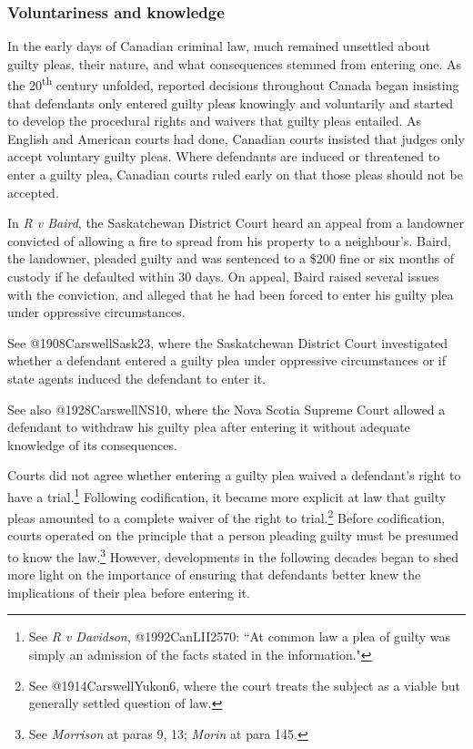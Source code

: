 \subsubsection{Voluntariness and knowledge}

In the early days of Canadian criminal law, much remained unsettled about guilty pleas, their nature, and what consequences stemmed from entering one. As the 20\textsuperscript{th} century unfolded, reported decisions throughout Canada began insisting that defendants only entered guilty pleas knowingly and voluntarily and started to develop the procedural rights and waivers that guilty pleas entailed. As English and American courts had done, Canadian courts insisted that judges only accept voluntary guilty pleas. Where defendants are induced or threatened to enter a guilty plea, Canadian courts ruled early on that those pleas should not be accepted.

In \textit{R v Baird}, the Saskatchewan District Court heard an appeal from a landowner convicted of allowing a fire to spread from his property to a neighbour's. Baird, the landowner, pleaded guilty and was sentenced to a \$200 fine or six months of custody if he defaulted within 30 days. On appeal, Baird raised several issues with the conviction, and alleged that he had been forced to enter his guilty plea under oppressive circumstances. 

See @1908CarswellSask23, where the Saskatchewan District Court investigated whether a defendant entered a guilty plea under oppressive circumstances or if state agents induced the defendant to enter it.

See also @1928CarswellNS10, where the Nova Scotia Supreme Court allowed a defendant to withdraw his guilty plea after entering it without adequate knowledge of its consequences.

Courts did not agree whether entering a guilty plea waived a defendant's right to have a trial.\footnote{See \textit{R v Davidson}, @1992CanLII2570: ``At common law a plea of guilty was simply an admission of the facts stated in the information."} Following codification, it became more explicit at law that guilty pleas amounted to a complete waiver of the right to trial.\footnote{See @1914CarswellYukon6, where the court treats the subject as a viable but generally settled question of law.} Before codification, courts operated on the principle that a person pleading guilty must be presumed to know the law.\footnote{See \textit{Morrison} at paras 9, 13; \textit{Morin} at para 145.} However, developments in the following decades began to shed more light on the importance of ensuring that defendants better knew the implications of their plea before entering it.

